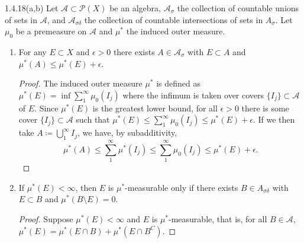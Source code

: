 \documentclass[11pt]{article}
\begin{document}
\begin{problem}{1.4.18(a,b)}
	Let \( \mathcal{A} \subset \mathcal{P}(X) \) be an algebra, \( \mathcal{A}_{\sigma} \) the collection of countable unions of sets in \( \mathcal{A} \), and \( \mathcal{A}_{\sigma\delta} \) the collection of countable intersections of sets in \( A_{\sigma} \).
	Let \( \mu_0 \) be a premeasure on \( \mathcal{A} \) and \( \mu^{*} \) the induced outer measure.  \begin{enumerate}[label=(\alph*)]
		\item For any \( E \subset X \) and \(\epsilon > 0\) there exists \( A \in \mathcal{A}_{\sigma} \) with \( E \subset A\) and \( \mu^{*}(A) \leq \mu^{*}(E) + \epsilon \).
		      \begin{proof}
			      The induced outer measure \(\mu^{*}\) is defined as \(\mu^{*}(E) = \inf \sum\limits_1^{\infty} \mu_0(I_j)\) where the infimum is taken over covers \( \{I_j\} \subset \mathcal{A} \) of \( E \).
			      Since \( \mu^{*}(E) \) is the greatest lower bound, for all \(\epsilon > 0\) there is some cover \( \{I_j\} \subset \mathcal{A} \) such that \( \mu^{*}(E) \leq \sum\limits_1^{\infty} \mu_0(I_j)  \leq \mu^{*}(E) + \epsilon\).
			      If we then take \( A \coloneq \bigcup_1^{\infty} I_j \), we have, by subadditivity,
			      \begin{equation}
				      \label{eq:7}
				      \mu^{*}(A) \leq \sum\limits_1^{\infty} \mu^{*}(I_{j}) \leq \sum\limits_1^{\infty} \mu_0(I_j) \leq \mu^{*}(E) + \epsilon.
			      \end{equation}
		      \end{proof}
		\item If \(\mu^{*}(E) < \infty\), then \( E \) is \( \mu^{*} \)-measurable only if there exists \( B \in A_{\sigma\delta} \) with \( E \subset B \) and \( \mu^{*}(B \setminus E) = 0 \).
		      \begin{proof}
			      Suppose \( \mu^{*}(E) < \infty \) and \( E \) is \(\mu^{*}\)-measurable, that is, for all \( B \in \mathcal{A} \), \( \mu^{*}(E) = \mu^{*}(E \cap B) + \mu^{*}(E \cap B^C) \).


\end{proof}
\end{enumerate}
\end{problem}
\end{document}
